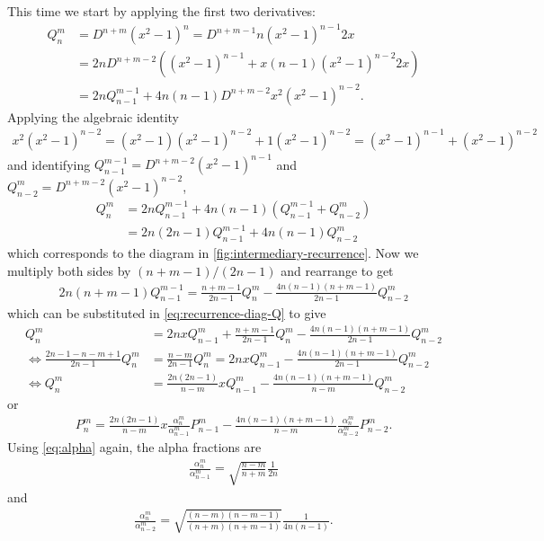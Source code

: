 \documentclass[12pt]{article}
\begin{document}
This time we start by applying the first two derivatives:
\begin{align}
  Q_n^m &= D^{n+m}(x^2-1)^n = D^{n+m-1}n(x^2-1)^{n-1}2x \\ 
        &= 2nD^{n+m-2}\left((x^2-1)^{n-1}+x(n-1)(x^2-1)^{n-2}2x\right)\\ 
        &= 2nQ_{n-1}^{m-1} + 4n(n-1)D^{n+m-2}x^2(x^2-1)^{n-2}.
\end{align}
Applying the algebraic identity 
\begin{align}
  x^2(x^2-1)^{n-2} = (x^2-1)(x^2-1)^{n-2} + 1(x^2-1)^{n-2} = (x^2-1)^{n-1} + (x^2-1)^{n-2}
\end{align}
and identifying $Q_{n-1}^{m-1}=D^{n+m-2}(x^2-1)^{n-1}$ and $Q_{n-2}^{m}=D^{n+m-2}(x^2-1)^{n-2}$,
\begin{align}
  Q_n^m &= 2nQ_{n-1}^{m-1} + 4n(n-1)\left(Q_{n-1}^{m-1} + Q_{n-2}^m\right)\\ 
        &= 2n(2n - 1)Q_{n-1}^{m-1} + 4n(n-1)Q_{n-2}^m
\end{align}
which corresponds to the diagram in \autoref{fig:intermediary-recurrence}. Now we multiply both sides by $(n+m-1)/(2n-1)$ and rearrange to get 
\begin{align}
  2n(n+m-1)Q_{n-1}^{m-1} = \frac{n+m-1}{2n-1}Q_n^m - \frac{4n(n-1)(n+m-1)}{2n-1}Q_{n-2}^m
\end{align}
which can be substituted in \eqref{eq:recurrence-diag-Q} to give 
\begin{align}
  Q_n^m &= 2nxQ_{n-1}^m + \frac{n+m-1}{2n-1}Q_n^m - \frac{4n(n-1)(n+m-1)}{2n-1}Q_{n-2}^m\\
  \iff \frac{2n-1-n-m+1}{2n-1}Q_n^m &= \frac{n-m}{2n-1}Q_n^m = 2nxQ_{n-1}^m - \frac{4n(n-1)(n+m-1)}{2n-1}Q_{n-2}^m\\ 
  \iff Q_n^m &= \frac{2n(2n-1)}{n-m}xQ_{n-1}^m - \frac{4n(n-1)(n+m-1)}{n-m}Q_{n-2}^m
\end{align}
or 
\begin{align}\label{eq:downward-recurreence-alpha}
  P_n^m = \frac{2n(2n-1)}{n-m}x\frac{\alpha_n^m}{\alpha_{n-1}^m}P_{n-1}^m - \frac{4n(n-1)(n+m-1)}{n-m}\frac{\alpha_n^m}{\alpha_{n-2}^m}P_{n-2}^m.
\end{align}
Using \eqref{eq:alpha} again, the alpha fractions are
\begin{align}
  \frac{\alpha_n^m}{\alpha_{n-1}^m} = \sqrt{\frac{n-m}{n+m}}\frac{1}{2n}
\end{align}
and 
\begin{align}
  \frac{\alpha_n^m}{\alpha_{n-2}^m} = \sqrt{\frac{(n-m)(n-m-1)}{(n+m)(n+m-1)}}\frac{1}{4n(n-1)}.
\end{align}
\end{document}
